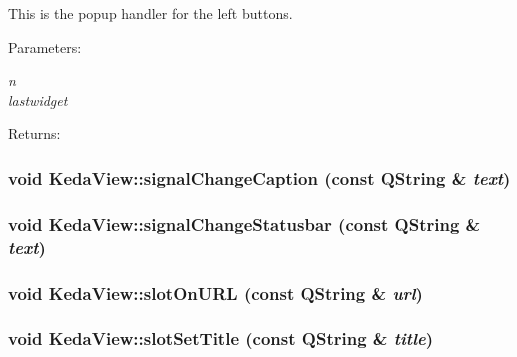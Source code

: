 This is the popup handler for the left buttons. \begin{Desc}
\item[Parameters:]
\begin{description}
\item[{\em n}]\item[{\em lastwidget}]\end{description}
\end{Desc}
\begin{Desc}
\item[Returns:]\end{Desc}
\subsubsection{\setlength{\rightskip}{0pt plus 5cm}void Keda\-View::signal\-Change\-Caption (const QString \& {\em text})\hspace{0.3cm}{\tt  [signal]}}\label{classKedaView_1640e1a8403c83b28da4a8c144e72a24}


\subsubsection{\setlength{\rightskip}{0pt plus 5cm}void Keda\-View::signal\-Change\-Statusbar (const QString \& {\em text})\hspace{0.3cm}{\tt  [signal]}}\label{classKedaView_a483002718991e728fbec2ad1de19bec}


\subsubsection{\setlength{\rightskip}{0pt plus 5cm}void Keda\-View::slot\-On\-URL (const QString \& {\em url})\hspace{0.3cm}{\tt  [private, slot]}}\label{classKedaView_503a57aeabd28ebad3fcdffb7dd30bcf}


\subsubsection{\setlength{\rightskip}{0pt plus 5cm}void Keda\-View::slot\-Set\-Title (const QString \& {\em title})\hspace{0.3cm}{\tt  [private, slot]}}\label{classKedaView_8ec7516cd95ae475094889b9a2ec4341}



